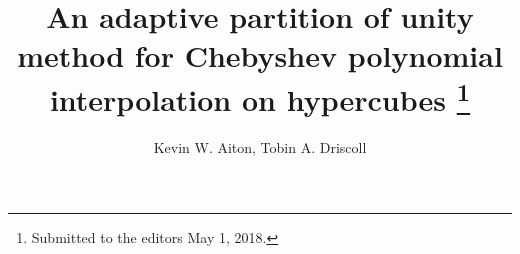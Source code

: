 

\usepackage{lipsum}
\usepackage{amsfonts}
\usepackage{graphicx}
\usepackage{epstopdf}
\usepackage{algorithmic}
\ifpdf
\else
\fi

\newcommand{\creflastconjunction}{, and~}






\title{An adaptive partition of unity method for Chebyshev polynomial interpolation on hypercubes \thanks{Submitted to the editors May 1, 2018.
}}

\author{Kevin W. Aiton, Tobin A. Driscoll}

\usepackage{amsopn}
\DeclareMathOperator{\diag}{diag}


